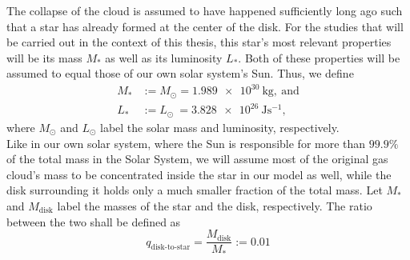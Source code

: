         The collapse of the cloud is assumed to have happened sufficiently long ago such
        that a star has already formed at the center of the disk. 
        For the studies that will be carried out in the context of this thesis, this star's 
        most relevant properties will be its mass $M_*$ as well as its luminosity $L_*$. 
        Both of these properties will be assumed to equal those of our own solar system's Sun. 
        Thus, we define
        \begin{align}
            M_*&:=M_\odot=\SI{1.989e30}{\kg},\ \text{and} \\
            L_*&:=L_\odot\ =\SI{3.828e26}{\joule\second^{-1}},
        \end{align}
        where $M_\odot$ and $L_\odot$ label the solar mass and luminosity, respectively.
        \\

        Like in our own solar system, where the Sun is responsible for more than $99.9\%$ of the 
        total mass in the Solar System, we will assume most of the original gas cloud's mass to be
        concentrated inside the star in our model as well, while the disk surrounding it holds only 
        a much smaller fraction of the total mass. 
        Let $M_*$ and $M_\text{disk}$ label the masses of the star and the disk, respectively.
        The ratio between the two shall be defined as
        \begin{equation}
            q_\text{disk-to-star}
                =\frac{M_\text{disk}}{M_*}  
                :=0.01
        \end{equation}

